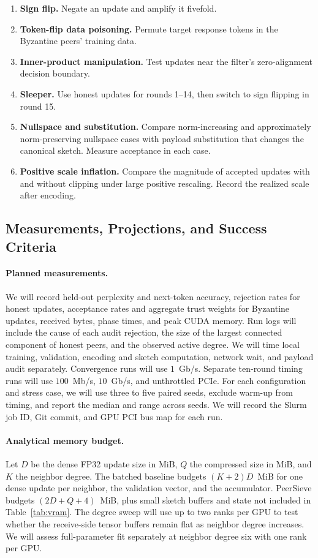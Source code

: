 \documentclass{article}
\begin{document}
\begin{enumerate}
  \item \textbf{Sign flip.} Negate an update and amplify it fivefold.
  \item \textbf{Token-flip data poisoning.} Permute target response tokens in the Byzantine peers' training data.
  \item \textbf{Inner-product manipulation.} Test updates near the filter's zero-alignment decision boundary.
  \item \textbf{Sleeper.} Use honest updates for rounds 1--14, then switch to sign flipping in round 15.
  \item \textbf{Nullspace and substitution.} Compare norm-increasing and approximately norm-preserving nullspace cases with payload substitution that changes the canonical sketch. Measure acceptance in each case.
  \item \textbf{Positive scale inflation.} Compare the magnitude of accepted updates with and without clipping under large positive rescaling. Record the realized scale after encoding.
\end{enumerate}

\subsection{Measurements, Projections, and Success Criteria}

\paragraph{Planned measurements.} We will record held-out perplexity and next-token accuracy, rejection rates for honest updates, acceptance rates and aggregate trust weights for Byzantine updates, received bytes, phase times, and peak CUDA memory. Run logs will include the cause of each audit rejection, the size of the largest connected component of honest peers, and the observed active degree. We will time local training, validation, encoding and sketch computation, network wait, and payload audit separately. Convergence runs will use $1$~Gb/s. Separate ten-round timing runs will use $100$~Mb/s, $10$~Gb/s, and unthrottled PCIe. For each configuration and stress case, we will use three to five paired seeds, exclude warm-up from timing, and report the median and range across seeds. We will record the Slurm job ID, Git commit, and GPU PCI bus map for each run.

\paragraph{Analytical memory budget.} Let $D$ be the dense FP32 update size in MiB, $Q$ the compressed size in MiB, and $K$ the neighbor degree. The batched baseline budgets $(K+2)D$~MiB for one dense update per neighbor, the validation vector, and the accumulator. PeerSieve budgets $(2D+Q+4)$~MiB, plus small sketch buffers and state not included in Table~\ref{tab:vram}. The degree sweep will use up to two ranks per GPU to test whether the receive-side tensor buffers remain flat as neighbor degree increases. We will assess full-parameter fit separately at neighbor degree six with one rank per GPU.
\end{document}
